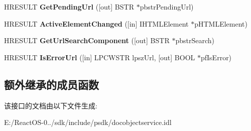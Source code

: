\begin{DoxyCompactItemize}
\item 
\mbox{\label{interface_i_doc_object_service_a74270c8e4bae7c547e83d33c25de2c37}} 
H\+R\+E\+S\+U\+LT {\bfseries Get\+Pending\+Url} (\mbox{[}out\mbox{]} B\+S\+TR $\ast$pbstr\+Pending\+Url)
\item 
\mbox{\label{interface_i_doc_object_service_a0f3db19614ca82597c05337844e14977}} 
H\+R\+E\+S\+U\+LT {\bfseries Active\+Element\+Changed} (\mbox{[}in\mbox{]} I\+H\+T\+M\+L\+Element $\ast$p\+H\+T\+M\+L\+Element)
\item 
\mbox{\label{interface_i_doc_object_service_a6ffbbd2556ba44487a160cbfdaf10d9f}} 
H\+R\+E\+S\+U\+LT {\bfseries Get\+Url\+Search\+Component} (\mbox{[}out\mbox{]} B\+S\+TR $\ast$pbstr\+Search)
\item 
\mbox{\label{interface_i_doc_object_service_a7ebf246f025af3218f35b3aaa3377992}} 
H\+R\+E\+S\+U\+LT {\bfseries Is\+Error\+Url} (\mbox{[}in\mbox{]} L\+P\+C\+W\+S\+TR lpsz\+Url, \mbox{[}out\mbox{]} B\+O\+OL $\ast$pf\+Is\+Error)
\end{DoxyCompactItemize}
\subsection*{额外继承的成员函数}


该接口的文档由以下文件生成\+:\begin{DoxyCompactItemize}
\item 
E\+:/\+React\+O\+S-\/0../sdk/include/psdk/docobjectservice.\+idl\end{DoxyCompactItemize}
